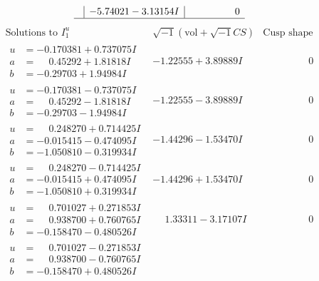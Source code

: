 \documentclass[1p]{elsarticle_modified}
\theoremstyle{definition}
\newcommand{\I}{\sqrt{-1}}
\begin{document}
$$\begin{array}{c|c|c}
 & -5.74021 - 3.13154 I & \phantom{-0.000000 } 0\\
 \hline 
 \end{array}$$\newpage$$\begin{array}{c|c|c}  
\text{Solutions to }I^u_{1}& \I (\text{vol} + \sqrt{-1}CS) & \text{Cusp shape}\\
 \hline 
\begin{aligned}
u &= -0.170381 + 0.737075 I \\
a &= \phantom{-}0.45292 + 1.81818 I \\
b &= -0.29703 + 1.94984 I\end{aligned}
 & -1.22555 + 3.89889 I & \phantom{-0.000000 } 0 \\ \hline\begin{aligned}
u &= -0.170381 - 0.737075 I \\
a &= \phantom{-}0.45292 - 1.81818 I \\
b &= -0.29703 - 1.94984 I\end{aligned}
 & -1.22555 - 3.89889 I & \phantom{-0.000000 } 0 \\ \hline\begin{aligned}
u &= \phantom{-}0.248270 + 0.714425 I \\
a &= -0.015415 - 0.474095 I \\
b &= -1.050810 - 0.319934 I\end{aligned}
 & -1.44296 - 1.53470 I & \phantom{-0.000000 } 0 \\ \hline\begin{aligned}
u &= \phantom{-}0.248270 - 0.714425 I \\
a &= -0.015415 + 0.474095 I \\
b &= -1.050810 + 0.319934 I\end{aligned}
 & -1.44296 + 1.53470 I & \phantom{-0.000000 } 0 \\ \hline\begin{aligned}
u &= \phantom{-}0.701027 + 0.271853 I \\
a &= \phantom{-}0.938700 + 0.760765 I \\
b &= -0.158470 - 0.480526 I\end{aligned}
 & \phantom{-}1.33311 - 3.17107 I & \phantom{-0.000000 } 0 \\ \hline\begin{aligned}
u &= \phantom{-}0.701027 - 0.271853 I \\
a &= \phantom{-}0.938700 - 0.760765 I \\
b &= -0.158470 + 0.480526 I\end{aligned}

\end{array}$$
\end{document}

